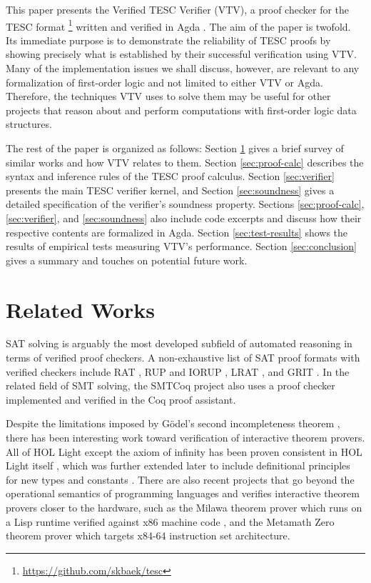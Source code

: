 \documentclass[12pt]{article}
\begin{document}
This paper presents the Verified TESC Verifier (VTV), a proof checker for  
the TESC format \footnote{\url{https://github.com/skbaek/tesc}} written and verified 
in Agda \cite{bove2009brief}. The aim of the paper is twofold. Its immediate purpose is 
to demonstrate the reliability of TESC proofs by showing precisely what is established 
by their successful verification using VTV. Many of the implementation issues we shall 
discuss, however, are relevant to any formalization of first-order logic and not 
limited to either VTV or Agda. Therefore, the techniques VTV uses to solve them may be 
useful for other projects that reason about and perform computations with first-order 
logic data structures.

The rest of the paper is organized as follows:
Section \ref{sec:rel-works} gives a brief survey of similar works and how VTV relates to them.
Section \ref{sec:proof-calc} describes the syntax and inference rules of the TESC proof calculus.
Section \ref{sec:verifier} presents the main TESC verifier kernel, and
Section \ref{sec:soundness} gives a detailed specification of the verifier's soundness property.
Sections \ref{sec:proof-calc}, \ref{sec:verifier}, and \ref{sec:soundness} also include code 
excerpts and discuss how their respective contents are formalized in Agda.
Section \ref{sec:test-results} shows the  results of empirical tests measuring VTV's performance.
Section \ref{sec:conclusion} gives a summary and touches on potential future work.

\section{Related Works} \label{sec:rel-works}

SAT solving is arguably the most developed subfield of automated reasoning in terms of 
verified proof checkers. A non-exhaustive list of SAT proof formats with verified checkers
include RAT \cite{heule2013verifying}, RUP and IORUP \cite{heule2014bridging},
LRAT \cite{cruz2017lrat}, and GRIT \cite{cruz2017grit}. In the related field of SMT solving,
the SMTCoq project \cite{armand2011modular} also uses a proof checker implemented and
verified in the Coq proof assistant.

Despite the limitations imposed by G\"odel's second incompleteness theorem \cite{godel1931formal},
there has been interesting work toward verification of interactive theorem provers. 
All of HOL Light except the axiom of infinity has been proven consistent in HOL Light itself \cite{harrison2006towards}, 
which was further extended later to include definitional principles for new types 
and constants \cite{kumar2014hol}. There are also recent projects that go 
beyond the operational semantics of programming languages and verifies interactive theorem provers 
closer to the hardware, such as the Milawa theorem prover which runs on a Lisp runtime
verified against x86 machine code \cite{davis2015reflective}, and the Metamath Zero 
\cite{carneiro2019metamath} theorem prover which targets x84-64 instruction set architecture. 
\end{document}
